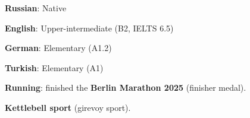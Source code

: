 \documentclass[10pt]{article}
\begin{document}
\begin{plainlist}
  \item \textbf{Russian}: Native
  \item \textbf{English}: Upper-intermediate (B2, IELTS 6.5)
  \item \textbf{German}: Elementary (A1.2)
  \item \textbf{Turkish}: Elementary (A1)
\end{plainlist}

\begin{plainlist}
  \item \textbf{Running}: finished the \textbf{Berlin Marathon 2025} (finisher medal).
  \item \textbf{Kettlebell sport} (girevoy sport).
\end{plainlist}
\end{document}

